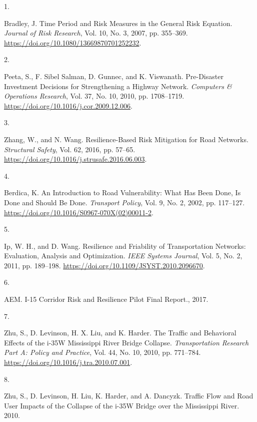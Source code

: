 \documentclass[
  letterpaper,
]{trb}
\newlength{\cslhangindent}
\newlength{\csllabelwidth}
\newlength{\cslentryspacingunit} %
\newenvironment{CSLReferences}[2] %
 {%
  \setlength{\parindent}{0pt}
  \ifodd #1
  \let\oldpar\par
  \def\par{\hangindent=\cslhangindent\oldpar}
  \fi
  \setlength{\parskip}{#2\cslentryspacingunit}
 }%
 {}
\newcommand{\CSLLeftMargin}[1]{\parbox[t]{\csllabelwidth}{#1}}
\newcommand{\CSLRightInline}[1]{\parbox[t]{\linewidth - \csllabelwidth}{#1}\break}
\begin{document}
\hypertarget{refs}{}
\begin{CSLReferences}{0}{0}
\leavevmode{}%
\CSLLeftMargin{1. }%
\CSLRightInline{Bradley, J. Time Period and Risk Measures in the General
Risk Equation. \emph{Journal of Risk Research}, Vol. 10, No. 3, 2007,
pp. 355--369. \url{https://doi.org/10.1080/13669870701252232}.}

\leavevmode{}%
\CSLLeftMargin{2. }%
\CSLRightInline{Peeta, S., F. Sibel Salman, D. Gunnec, and K. Viswanath.
Pre-Disaster Investment Decisions for Strengthening a Highway Network.
\emph{Computers \& Operations Research}, Vol. 37, No. 10, 2010, pp.
1708--1719. \url{https://doi.org/10.1016/j.cor.2009.12.006}.}

\leavevmode{}%
\CSLLeftMargin{3. }%
\CSLRightInline{Zhang, W., and N. Wang. Resilience-Based Risk Mitigation
for Road Networks. \emph{Structural Safety}, Vol. 62, 2016, pp. 57--65.
\url{https://doi.org/10.1016/j.strusafe.2016.06.003}.}

\leavevmode{}%
\CSLLeftMargin{4. }%
\CSLRightInline{Berdica, K. An Introduction to Road Vulnerability: What
Has Been Done, Is Done and Should Be Done. \emph{Transport Policy}, Vol.
9, No. 2, 2002, pp. 117--127.
\url{https://doi.org/10.1016/S0967-070X(02)00011-2}.}

\leavevmode{}%
\CSLLeftMargin{5. }%
\CSLRightInline{Ip, W. H., and D. Wang. Resilience and Friability of
Transportation Networks: Evaluation, Analysis and Optimization.
\emph{IEEE Systems Journal}, Vol. 5, No. 2, 2011, pp. 189--198.
\url{https://doi.org/10.1109/JSYST.2010.2096670}.}

\leavevmode{}%
\CSLLeftMargin{6. }%
\CSLRightInline{AEM. I-15 Corridor Risk and Resilience Pilot Final
Report., 2017.}

\leavevmode{}%
\CSLLeftMargin{7. }%
\CSLRightInline{Zhu, S., D. Levinson, H. X. Liu, and K. Harder. The
Traffic and Behavioral Effects of the i-35W Mississippi River Bridge
Collapse. \emph{Transportation Research Part A: Policy and Practice},
Vol. 44, No. 10, 2010, pp. 771--784.
\url{https://doi.org/10.1016/j.tra.2010.07.001}.}

\leavevmode{}%
\CSLLeftMargin{8. }%
\CSLRightInline{Zhu, S., D. Levinson, H. Liu, K. Harder, and A. Dancyzk.
Traffic Flow and Road User Impacts of the Collapse of the i-35W Bridge
over the Mississippi River. 2010.}


\end{CSLReferences}
\end{document}
